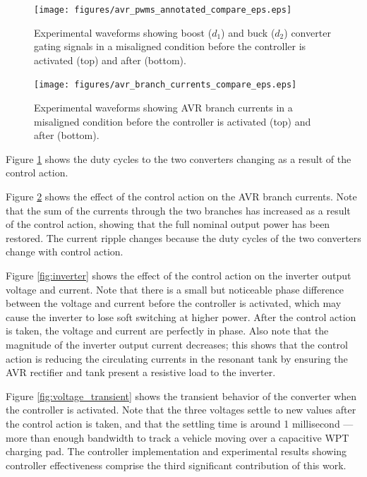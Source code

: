 \documentclass[conference, twocolumn, letterpaper]{IEEEtran}
\begin{document}
\begin{figure}[!ht]
	\centering
	\texttt{[image: figures/avr\_pwms\_annotated\_compare\_eps.eps]}
	\caption{Experimental waveforms showing boost ($d_1$) and buck ($d_2$) converter gating signals in a misaligned condition before the controller is activated (top) and after (bottom).}
	\label{fig:pwms}
\end{figure}

\begin{figure}[ht]
	\centering
	\texttt{[image: figures/avr\_branch\_currents\_compare\_eps.eps]}
	\caption{Experimental waveforms showing AVR branch currents in a misaligned condition before the controller is activated (top) and after (bottom).}
	\label{fig:branch_currents}
\end{figure}

Figure \ref{fig:pwms} shows the duty cycles to the two converters changing as a result of the control action.

Figure \ref{fig:branch_currents} shows the effect of the control action on the AVR branch currents. Note that the sum of the currents through the two branches has increased as a result of the control action, showing that the full nominal output power has been restored. The current ripple changes because the duty cycles of the two converters change with control action. 

Figure \ref{fig:inverter} shows the effect of the control action on the inverter output voltage and current. Note that there is a small but noticeable phase difference between the voltage and current before the controller is activated, which may cause the inverter to lose soft switching at higher power. After the control action is taken, the voltage and current are perfectly in phase. Also note that the magnitude of the inverter output current decreases; this shows that the control action is reducing the circulating currents in the resonant tank by ensuring the AVR rectifier and tank present a resistive load to the inverter. 

Figure \ref{fig:voltage_transient} shows the transient behavior of the converter when the controller is activated. Note that the three voltages settle to new values after the control action is taken, and that the settling time is around 1 millisecond --- more than enough bandwidth to track a vehicle moving over a capacitive WPT charging pad. The controller implementation and experimental results showing controller effectiveness comprise the third significant contribution of this work.
\end{document}

